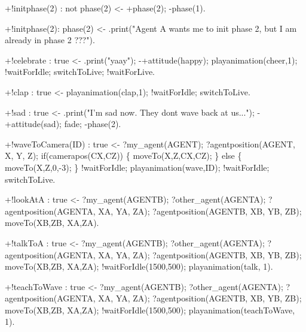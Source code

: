\documentclass[draft,final]{vutinfth} %
\begin{document}
{+!initphase(2) : not phase(2)
                    <-  +phase(2);
                        -phase(1).

+!initphase(2): phase(2)
                    <-  .print("Agent A wants me to init phase 2, but I am already in phase 2 ???").

+!celebrate : true
                    <-  .print("yaay");
                        -+attitude(happy);
                        playanimation(cheer,1);
                        !waitForIdle;
                        switchToLive;
                        !waitForLive.

+!clap : true
                    <-  playanimation(clap,1);
                        !waitForIdle;
                        switchToLive.

+!sad : true
                    <-  .print("I'm sad now. They dont wave back at us...");
                        -+attitude(sad);
                        fade; 
                        -phase(2).

+!waveToCamera(ID) : true
                    <-  ?my\_agent(AGENT);
                        ?agentposition(AGENT, X, Y, Z);
                        if(camerapos(CX,CZ))
                        \{
                           moveTo(X,Z,CX,CZ);             
                        \}
                        else
                        \{
                            moveTo(X,Z,0,-3);       
                        \}
                        !waitForIdle;
                        playanimation(wave,ID);
                        !waitForIdle;
                        switchToLive.

+!lookAtA : true
                    <-  ?my\_agent(AGENTB);
                        ?other\_agent(AGENTA);
                        ?agentposition(AGENTA, XA, YA, ZA);
                        ?agentposition(AGENTB, XB, YB, ZB);
                        moveTo(XB,ZB, XA,ZA).

+!talkToA : true
                    <-  ?my\_agent(AGENTB);
                        ?other\_agent(AGENTA);
                        ?agentposition(AGENTA, XA, YA, ZA);
                        ?agentposition(AGENTB, XB, YB, ZB);
                        moveTo(XB,ZB, XA,ZA);
                        !waitForIdle(1500,500);
                        playanimation(talk, 1).

+!teachToWave : true
                    <-  ?my\_agent(AGENTB);
                        ?other\_agent(AGENTA);
                        ?agentposition(AGENTA, XA, YA, ZA);
                        ?agentposition(AGENTB, XB, YB, ZB);
                        moveTo(XB,ZB, XA,ZA);
                        !waitForIdle(1500,500);
                        playanimation(teachToWave, 1).
                        
}
\end{document}
